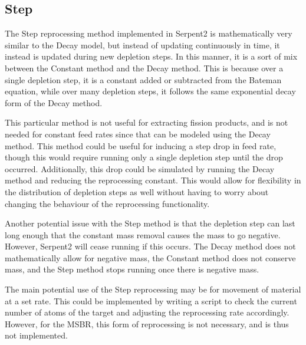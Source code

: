 


\subsection{Step}

The Step reprocessing method implemented in Serpent2 is mathematically very similar to the Decay model, but instead of updating continuously in time, it instead is updated during new depletion steps. In this manner, it is a sort of mix between the Constant method and the Decay method. This is because over a single depletion step, it is a constant added or subtracted from the Bateman equation, while over many depletion steps, it follows the same exponential decay form of the Decay method.

This particular method is not useful for extracting fission products, and is not needed for constant feed rates since that can be modeled using the Decay method. This method could be useful for inducing a step drop in feed rate, though this would require running only a single depletion step until the drop occurred. Additionally, this drop could be simulated by running the Decay method and reducing the reprocessing constant. This would allow for flexibility in the distribution of depletion steps as well without having to worry about changing the behaviour of the reprocessing functionality.

Another potential issue with the Step method is that the depletion step can last long enough that the constant mass removal causes the mass to go negative. However, Serpent2 will cease running if this occurs. The Decay method does not mathematically allow for negative mass, the Constant method does not conserve mass, and the Step method stops running once there is negative mass.

The main potential use of the Step reprocessing may be for movement of material at a set rate. This could be implemented by writing a script to check the current number of atoms of the target and adjusting the reprocessing rate accordingly. However, for the MSBR, this form of reprocessing is not necessary, and is thus not implemented.

